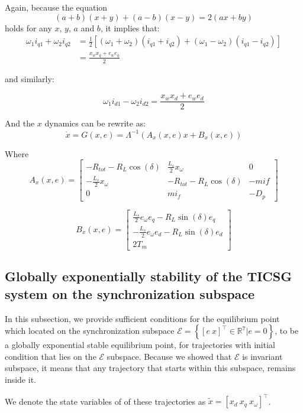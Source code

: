 \documentclass[letterpaper, 10 pt, conference]{ieeeconf}  %
\begin{document}
Again, because the  equation  
$$
(a+b)(x+y)+(a-b)(x-y)=2(ax+by)
$$
holds for any $x$, $y$, $a$ and $b$, it implies that:
$$
\begin{aligned}
\omega_{1}i_{q1}+\omega_{2}i_{q2} &=\frac{1}{2}\left[(\omega_{1}+\omega_{2})(i_{q1}+i_{q2})+(\omega_{1}-\omega_{2})(i_{q1}-i_{q2})\right]\\ & =\frac{x_{w}x_{q}+e_{w}e_{q}}{2}
\end{aligned}
$$

and similarly:

$$
\omega_{1}i_{d1}-\omega_{2}i_{d2}=\frac{x_{w}x_{d}+e_{w}e_{d}}{2}
$$ 

And the $x$ dynamics can be rewrite as:
$$ \dot{x}=G \left( x,e\right)= \Lambda^{-1}\left(A_x \left(x,e \right) x + B_x \left( x,e\right) \right) $$

Where
$$
A_x \left(x,e \right)=\left[\begin{array}{ccc}
-R_{tot}-R_{L}\cos(\delta) & \frac{L_{s}}{2}x_{\omega} & 0\\
-\frac{L_{s}}{2}x_{\omega} & -R_{tot}-R_{L}\cos(\delta) & -mif\\
0 & mi_{f} & -D_{p}
\end{array}\right]
$$

$$
B_x \left(x,e \right)=\left[\begin{array}{c}
\frac{L_{s}}{2}e_{\omega}e_{q}-R_{L}\sin(\delta)e_{q}\\
-\frac{L_{s}}{2}e_{\omega}e_{d}-R_{L}\sin(\delta)e_{d}\\
2T_{m}
\end{array}\right]
$$

\subsection{Globally exponentially stability of the TICSG system on the synchronization subspace }

In this subsection, we provide sufficient conditions for the equilibrium
point which located on the synchronization subspace $\mathscr{E}=\left\{ \left[ e\ x \right]^\top \in\mathbb{R}^{7}|e=0\right\} $,  to be a globally exponential stable equilibrium point, for trajectories with initial condition that lies on the $\mathscr{E}$ subspace.  Because we showed that  $\mathscr{E}$ is invariant subspace, it means that any trajectory that starts within this subspace, remains inside it.

We denote the state variables of of these trajectories as $\tilde{x} = \left[x_d \ x_q\ x_\omega \right]^\top$. 
\end{document}
